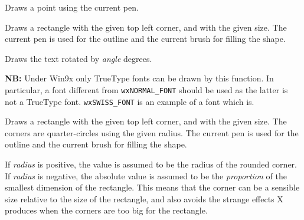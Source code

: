 \label{wxdcdrawpoint}


Draws a point using the current pen.


\label{wxdcdrawrectangle}


Draws a rectangle with the given top left corner, and with the given
size.  The current pen is used for the outline and the current brush
for filling the shape.


\label{wxdcdrawrotatedtext}


Draws the text rotated by {\it angle} degrees.

{\bf NB:} Under Win9x only TrueType fonts can be drawn by this function. In
particular, a font different from {\tt wxNORMAL\_FONT} should be used as the
latter is not a TrueType font. {\tt wxSWISS\_FONT} is an example of a font
which is.




\label{wxdcdrawroundedrectangle}


Draws a rectangle with the given top left corner, and with the given
size.  The corners are quarter-circles using the given radius. The
current pen is used for the outline and the current brush for filling
the shape.

If {\it radius} is positive, the value is assumed to be the
radius of the rounded corner. If {\it radius} is negative,
the absolute value is assumed to be the {\it proportion} of the smallest
dimension of the rectangle. This means that the corner can be
a sensible size relative to the size of the rectangle, and also avoids
the strange effects X produces when the corners are too big for
the rectangle.


\label{wxdcdrawspline}

